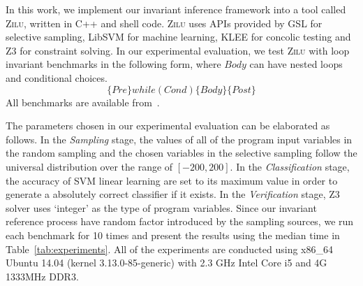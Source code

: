 In this work, we implement our invariant inference framework into a tool called \textsc{Zilu}, 
written in C++ and shell code. 
\textsc{Zilu} uses APIs provided by GSL for selective sampling, LibSVM for machine learning, 
KLEE for concolic testing and Z3 for constraint solving. 
In our experimental evaluation, 
we test \textsc{Zilu} with  loop invariant benchmarks 
in the following form, where $\mathit{Body}$ can have nested loops and conditional choices. 
\[
    \{ \mathit{Pre} \} \mathit{while}(\mathit{Cond}) \{ \mathit{Body} \} \{ \mathit{Post} \}
\]
All benchmarks are available from~\cite{zilu}. 

The parameters chosen in our experimental evaluation can be elaborated as follows. 
In the \emph{Sampling} stage, 
the values of all of the program input variables in the random sampling 
and the chosen variables in the selective sampling 
follow the universal distribution over the range of $[-200, 200]$. 
In the \emph{Classification} stage, 
the accuracy of SVM linear learning are set to its maximum value 
in order to generate a absolutely correct classifier if it exists. 
In the \emph{Verification} stage, 
Z3 solver uses `integer' as the type of program variables. 
Since our invariant reference process have random factor 
introduced by the sampling sources, 
we run each benchmark for 10 times 
and present the results using the median time in Table~\ref{tab:experiments}. 
All of the experiments are conducted using x86\_64 Ubuntu 14.04 (kernel 3.13.0-85-generic) 
with 2.3 GHz Intel Core i5 and 4G 1333MHz DDR3. 



